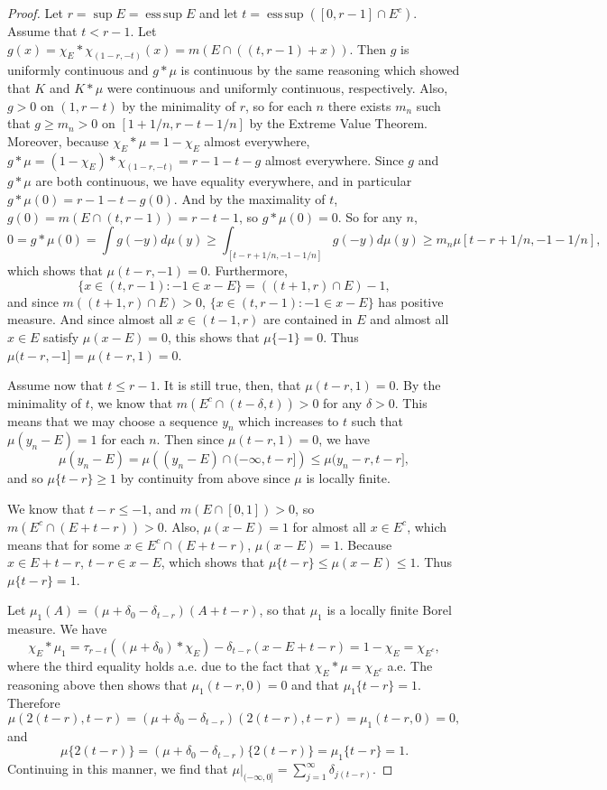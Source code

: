 \documentclass[10pt,a4paper]{amsart}
\DeclareMathOperator{\esssup}{ess\,sup}
\begin{document}
\begin{proof}
    Let $r=\sup E=\esssup E$ and let $t=\esssup\left([0,r-1]\cap E^c\right)$. Assume that $t<r-1$. Let $g(x)=\chi_E*\chi_{(1-r,-t)}(x)=m(E\cap((t,r-1)+x))$. Then $g$ is uniformly continuous and $g*\mu$ is continuous by the same reasoning which showed that $K$ and $K*\mu$ were continuous and uniformly continuous, respectively. Also, $g>0$ on $(1,r-t)$ by the minimality of $r$, so for each $n$ there exists $m_n$ such that $g\ge m_n>0$ on $[1+1/n,r-t-1/n]$ by the Extreme Value Theorem. Moreover, because $\chi_E*\mu=1-\chi_E$ almost everywhere, $g*\mu=(1-\chi_E)*\chi_{(1-r,-t)}=r-1-t-g$ almost everywhere. Since $g$ and $g*\mu$ are both continuous, we have equality everywhere, and in particular $g*\mu(0)=r-1-t-g(0)$. And by the maximality of $t$, $g(0)=m(E\cap(t,r-1))=r-t-1$, so $g*\mu(0)=0$. So for any $n$,
    $$0=g*\mu(0)=\int g(-y)d\mu(y)\ge \int_{[t-r+1/n,-1-1/n]}g(-y)d\mu(y)\ge m_n\mu[t-r+1/n,-1-1/n],$$
    which shows that $\mu(t-r,-1)=0$. Furthermore,
    $$\{x\in (t,r-1):-1\in x-E\}=\left((t+1,r)\cap E\right)-1,$$
    and since $m((t+1,r)\cap E)>0$, $\{x\in (t,r-1):-1\in x-E\}$ has positive measure. And since almost all $x\in (t-1,r)$ are contained in $E$ and almost all $x\in E$ satisfy $\mu(x-E)=0$, this shows that $\mu\{-1\}=0$. Thus $\mu(t-r,-1]=\mu(t-r,1)=0$.

    Assume now that $t\leq r-1$. It is still true, then, that $\mu(t-r,1)=0$. By the minimality of $t$, we know that $m(E^c\cap (t-\delta,t))>0$ for any $\delta>0$. This means that we may choose a sequence $y_n$ which increases to $t$ such that $\mu(y_n-E)=1$ for each $n$. Then since $\mu(t-r,1)=0$, we have
    $$\mu(y_n-E)=\mu\left((y_n-E)\cap(-\infty,t-r]\right)\leq \mu(y_n-r,t-r],$$
    and so $\mu\{t-r\}\ge 1$ by continuity from above since $\mu$ is locally finite. 
    
    We know that $t-r\leq -1$, and $m(E\cap[0,1])>0$, so $m(E^c\cap(E+t-r))>0$. Also, $\mu(x-E)=1$ for almost all $x\in E^c$, which means that for some $x\in E^c\cap(E+t-r)$, $\mu(x-E)=1$. Because $x\in E+t-r$, $t-r\in x-E$, which shows that $\mu\{t-r\}\leq\mu(x-E)\leq 1$. Thus $\mu\{t-r\}=1$.

    Let $\mu_1(A)=(\mu+\delta_0-\delta_{t-r})(A+t-r)$, so that $\mu_1$ is a locally finite Borel measure. We have
    $$\chi_E*\mu_1=\tau_{r-t}((\mu+\delta_0)*\chi_E)-\delta_{t-r}(x-E+t-r)=1-\chi_E=\chi_{E^c},$$
    where the third equality holds a.e. due to the fact that $\chi_E*\mu=\chi_{E^c}$ a.e. The reasoning above then shows that $\mu_1(t-r,0)=0$ and that $\mu_1\{t-r\}=1$. Therefore
    $$\mu(2(t-r),t-r)=(\mu+\delta_0-\delta_{t-r})(2(t-r),t-r)=\mu_1(t-r,0)=0,$$
    and
    $$\mu\{2(t-r)\}=(\mu+\delta_0-\delta_{t-r})\{2(t-r)\}=\mu_1\{t-r\}=1.$$
    Continuing in this manner, we find that $\mu|_{(-\infty,0]}=\sum_{j=1}^\infty \delta_{j(t-r)}$. 
    

\end{proof}
\end{document}
